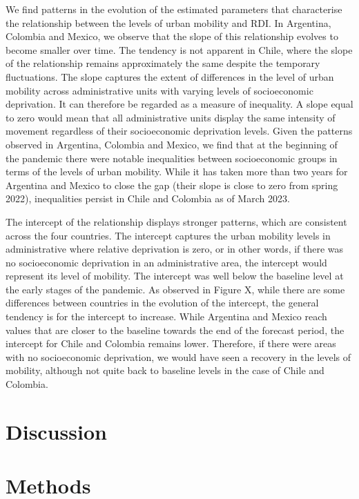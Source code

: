 \documentclass[
  11pt,
]{article}
\begin{document}
We find patterns in the evolution of the estimated parameters that
characterise the relationship between the levels of urban mobility and
RDI. In Argentina, Colombia and Mexico, we observe that the slope of
this relationship evolves to become smaller over time. The tendency is
not apparent in Chile, where the slope of the relationship remains
approximately the same despite the temporary fluctuations. The slope
captures the extent of differences in the level of urban mobility across
administrative units with varying levels of socioeconomic deprivation.
It can therefore be regarded as a measure of inequality. A slope equal
to zero would mean that all administrative units display the same
intensity of movement regardless of their socioeconomic deprivation
levels. Given the patterns observed in Argentina, Colombia and Mexico,
we find that at the beginning of the pandemic there were notable
inequalities between socioeconomic groups in terms of the levels of
urban mobility. While it has taken more than two years for Argentina and
Mexico to close the gap (their slope is close to zero from spring 2022),
inequalities persist in Chile and Colombia as of March 2023.

The intercept of the relationship displays stronger patterns, which are
consistent across the four countries. The intercept captures the urban
mobility levels in administrative where relative deprivation is zero, or
in other words, if there was no socioeconomic deprivation in an
administrative area, the intercept would represent its level of
mobility. The intercept was well below the baseline level at the early
stages of the pandemic. As observed in Figure X, while there are some
differences between countries in the evolution of the intercept, the
general tendency is for the intercept to increase. While Argentina and
Mexico reach values that are closer to the baseline towards the end of
the forecast period, the intercept for Chile and Colombia remains lower.
Therefore, if there were areas with no socioeconomic deprivation, we
would have seen a recovery in the levels of mobility, although not quite
back to baseline levels in the case of Chile and Colombia.

\section{Discussion}\label{sec-discussion}

\section{Methods}\label{sec-methods}
\end{document}
